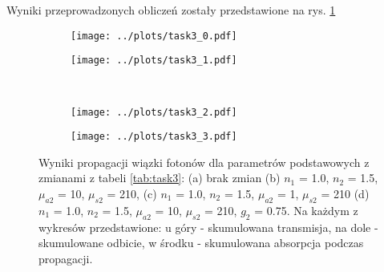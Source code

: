 \documentclass[a4paper, 12pt]{article}
\begin{document}
	\noindent Wyniki przeprowadzonych obliczeń zostały przedstawione na rys. \ref{fig:task3_calc}
		
	\begin{figure}[H]
		\centering
		\begin{subfigure}{0.49\textwidth}
			\centering
			\texttt{[image: ../plots/task3\_0.pdf]}
			\caption{}
		\end{subfigure}
		\begin{subfigure}{0.49\textwidth}
			\centering
			\texttt{[image: ../plots/task3\_1.pdf]}
			\caption{}
		\end{subfigure}
		\\
		\begin{subfigure}{0.49\textwidth}
			\centering
			\texttt{[image: ../plots/task3\_2.pdf]}
			\caption{}
		\end{subfigure}
		\begin{subfigure}{0.49\textwidth}
			\centering
			\texttt{[image: ../plots/task3\_3.pdf]}
			\caption{}
		\end{subfigure}
		\caption{Wyniki propagacji wiązki fotonów dla parametrów podstawowych z zmianami z tabeli \ref{tab:task3}: (a) brak zmian  (b) $n_1$ = 1.0, $n_2$ = 1.5, $\mu_{a2}$ = 10, $\mu_{s2}$ = 210, (c) $n_1$ = 1.0, $n_2$ = 1.5, $\mu_{a2}$ = 1, $\mu_{s2}$ = 210 (d) $n_1$ = 1.0, $n_2$ = 1.5, $\mu_{a2}$ = 10, $\mu_{s2}$ = 210, $g_2$ = 0.75. Na każdym z wykresów przedstawione: u góry - skumulowana transmisja, na dole - skumulowane odbicie, w środku - skumulowana absorpcja podczas propagacji.}
		\label{fig:task3_calc}
	\end{figure}	
	
\end{document}
